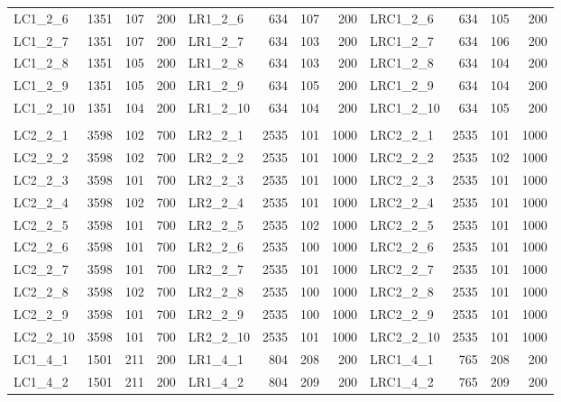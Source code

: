 \documentclass{anpet}
\begin{document}
\begin{table}[H]
\begin{tabular}{lrrr|lrrr|lrrr}
        LC1\_2\_6  & 1351 & 107 & 200 & LR1\_2\_6  &  634 & 107 &  200 & LRC1\_2\_6  &  634 & 105 &  200\\
        LC1\_2\_7  & 1351 & 107 & 200 & LR1\_2\_7  &  634 & 103 &  200 & LRC1\_2\_7  &  634 & 106 &  200\\
        LC1\_2\_8  & 1351 & 105 & 200 & LR1\_2\_8  &  634 & 103 &  200 & LRC1\_2\_8  &  634 & 104 &  200\\
        LC1\_2\_9  & 1351 & 105 & 200 & LR1\_2\_9  &  634 & 105 &  200 & LRC1\_2\_9  &  634 & 104 &  200\\
        LC1\_2\_10 & 1351 & 104 & 200 & LR1\_2\_10 &  634 & 104 &  200 & LRC1\_2\_10 &  634 & 105 &  200\\
                   &      &     &     &            &      &     &      &             &      &     &     \\
        LC2\_2\_1  & 3598 & 102 & 700 & LR2\_2\_1  & 2535 & 101 & 1000 & LRC2\_2\_1  & 2535 & 101 & 1000\\
        LC2\_2\_2  & 3598 & 102 & 700 & LR2\_2\_2  & 2535 & 101 & 1000 & LRC2\_2\_2  & 2535 & 102 & 1000\\
        LC2\_2\_3  & 3598 & 101 & 700 & LR2\_2\_3  & 2535 & 101 & 1000 & LRC2\_2\_3  & 2535 & 101 & 1000\\
        LC2\_2\_4  & 3598 & 102 & 700 & LR2\_2\_4  & 2535 & 101 & 1000 & LRC2\_2\_4  & 2535 & 101 & 1000\\
        LC2\_2\_5  & 3598 & 101 & 700 & LR2\_2\_5  & 2535 & 102 & 1000 & LRC2\_2\_5  & 2535 & 101 & 1000\\
        LC2\_2\_6  & 3598 & 101 & 700 & LR2\_2\_6  & 2535 & 100 & 1000 & LRC2\_2\_6  & 2535 & 101 & 1000\\
        LC2\_2\_7  & 3598 & 101 & 700 & LR2\_2\_7  & 2535 & 101 & 1000 & LRC2\_2\_7  & 2535 & 101 & 1000\\
        LC2\_2\_8  & 3598 & 102 & 700 & LR2\_2\_8  & 2535 & 100 & 1000 & LRC2\_2\_8  & 2535 & 101 & 1000\\
        LC2\_2\_9  & 3598 & 101 & 700 & LR2\_2\_9  & 2535 & 100 & 1000 & LRC2\_2\_9  & 2535 & 101 & 1000\\
        LC2\_2\_10 & 3598 & 101 & 700 & LR2\_2\_10 & 2535 & 101 & 1000 & LRC2\_2\_10 & 2535 & 101 & 1000\\
        \midrule
        LC1\_4\_1  & 1501 & 211 & 200 & LR1\_4\_1  &  804 & 208 &  200 & LRC1\_4\_1  &  765 & 208 &  200\\
        LC1\_4\_2  & 1501 & 211 & 200 & LR1\_4\_2  &  804 & 209 &  200 & LRC1\_4\_2  &  765 & 209 &  200\\

\end{tabular}
\end{table}
\end{document}

